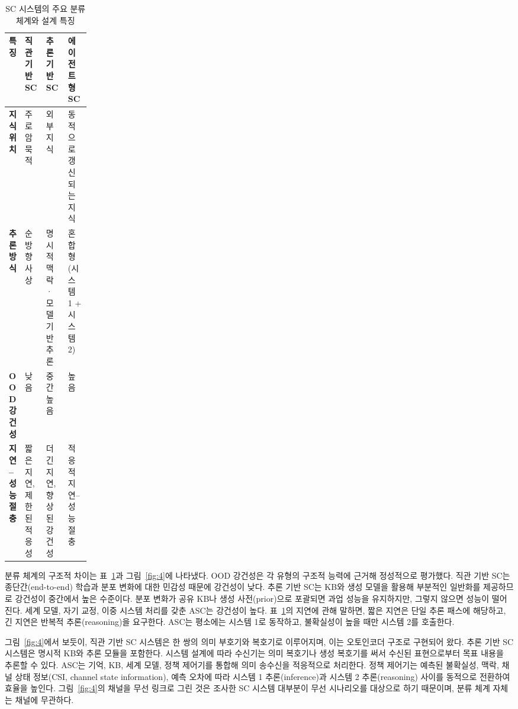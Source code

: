 \setcounter{table}{5}
\begin{table}[htbp]
\centering
\caption{SC 시스템의 주요 분류 체계와 설계 특징}
\label{tab:6}
\small
\renewcommand{\arraystretch}{1.2}
\begin{tabularx}{\linewidth}{|>{\centering\arraybackslash}p{0.16\linewidth}|>{\centering\arraybackslash}X|>{\centering\arraybackslash}X|>{\centering\arraybackslash}X|}
\hline
\textbf{특징} & \textbf{직관 기반 SC} & \textbf{추론 기반 SC} & \textbf{에이전트형 SC} \\
\hline
\textbf{지식 위치} & 주로 암묵적 & 외부 지식 & 동적으로 갱신되는 지식 \\
\hline
\textbf{추론 방식} & 순방향 사상 & 명시적 맥락·모델 기반 추론 & 혼합형 (시스템 1 + 시스템 2) \\
\hline
\textbf{OOD 강건성} & 낮음 & 중간~높음 & 높음 \\
\hline
\textbf{지연--성능 절충} & 짧은 지연, 제한된 적응성 & 더 긴 지연, 향상된 강건성 & 적응적 지연--성능 절충 \\
\hline
\end{tabularx}
\end{table}

분류 체계의 구조적 차이는 표~\ref{tab:6}과 그림~\ref{fig:4}에 나타냈다. OOD 강건성은 각 유형의 구조적 능력에 근거해 정성적으로 평가했다. 직관 기반 SC는 종단간(end-to-end) 학습과 분포 변화에 대한 민감성 때문에 강건성이 낮다. 추론 기반 SC는 KB와 생성 모델을 활용해 부분적인 일반화를 제공하므로 강건성이 중간에서 높은 수준이다. 분포 변화가 공유 KB나 생성 사전(prior)으로 포괄되면 과업 성능을 유지하지만, 그렇지 않으면 성능이 떨어진다. 세계 모델, 자기 교정, 이중 시스템 처리를 갖춘 ASC는 강건성이 높다. 표~\ref{tab:6}의 지연에 관해 말하면, 짧은 지연은 단일 추론 패스에 해당하고, 긴 지연은 반복적 추론(reasoning)을 요구한다. ASC는 평소에는 시스템 1로 동작하고, 불확실성이 높을 때만 시스템 2를 호출한다.

그림~\ref{fig:4}에서 보듯이, 직관 기반 SC 시스템은 한 쌍의 의미 부호기와 복호기로 이루어지며, 이는 오토인코더 구조로 구현되어 왔다. 추론 기반 SC 시스템은 명시적 KB와 추론 모듈을 포함한다. 시스템 설계에 따라 수신기는 의미 복호기나 생성 복호기를 써서 수신된 표현으로부터 목표 내용을 추론할 수 있다. ASC는 기억, KB, 세계 모델, 정책 제어기를 통합해 의미 송수신을 적응적으로 처리한다. 정책 제어기는 예측된 불확실성, 맥락, 채널 상태 정보(CSI, channel state information), 예측 오차에 따라 시스템 1 추론(inference)과 시스템 2 추론(reasoning) 사이를 동적으로 전환하여 효율을 높인다. 그림~\ref{fig:4}의 채널을 무선 링크로 그린 것은 조사한 SC 시스템 대부분이 무선 시나리오를 대상으로 하기 때문이며, 분류 체계 자체는 채널에 무관하다.
